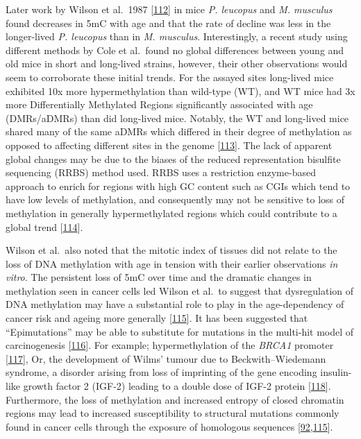 \documentclass[
]{book}
\begin{document}
Later work by Wilson et al.~1987 {[}\protect\hyperlink{ref-Wilson1987}{112}{]} in mice \emph{P. leucopus} and \emph{M. musculus} found decreases in 5mC with age and that the rate of decline was less in the longer-lived \emph{P. leucopus} than in \emph{M. musculus}.
Interestingly, a recent study using different methods by Cole et al.~found no global differences between young and old mice in short and long-lived strains, however, their other observations would seem to corroborate these initial trends.
For the assayed sites long-lived mice exhibited 10x more hypermethylation than wild-type (WT), and WT mice had 3x more Differentially Methylated Regions significantly associated with age (DMRs/aDMRs) than did long-lived mice.
Notably, the WT and long-lived mice shared many of the same aDMRs which differed in their degree of methylation as opposed to affecting different sites in the genome {[}\protect\hyperlink{ref-Cole2017}{113}{]}.
The lack of apparent global changes may be due to the biases of the reduced representation bisulfite sequencing (RRBS) method used.
RRBS uses a restriction enzyme-based approach to enrich for regions with high GC content such as CGIs which tend to have low levels of methylation, and consequently may not be sensitive to loss of methylation in generally hypermethylated regions which could contribute to a global trend {[}\protect\hyperlink{ref-Meissner2005}{114}{]}.

Wilson et al.~also noted that the mitotic index of tissues did not relate to the loss of DNA methylation with age in tension with their earlier observations \emph{in vitro}.
The persistent loss of 5mC over time and the dramatic changes in methylation seen in cancer cells led Wilson et al.~to suggest that dysregulation of DNA methylation may have a substantial role to play in the age-dependency of cancer risk and ageing more generally {[}\protect\hyperlink{ref-Feinberg2004}{115}{]}.
It has been suggested that ``Epimutations'' may be able to substitute for mutations in the multi-hit model of carcinogenesis {[}\protect\hyperlink{ref-Knudson1971}{116}{]}.
For example; hypermethylation of the \emph{BRCA1} promoter {[}\protect\hyperlink{ref-Esteller2000}{117}{]}, Or, the development of Wilms' tumour due to Beckwith--Wiedemann syndrome, a disorder arising from loss of imprinting of the gene encoding insulin-like growth factor 2 (IGF-2) leading to a double dose of IGF-2 protein {[}\protect\hyperlink{ref-Feinberg2018}{118}{]}.
Furthermore, the loss of methylation and increased entropy of closed chromatin regions may lead to increased susceptibility to structural mutations commonly found in cancer cells through the exposure of homologous sequences {[}\protect\hyperlink{ref-Jenkinson2017}{92},\protect\hyperlink{ref-Feinberg2004}{115}{]}.
\end{document}
